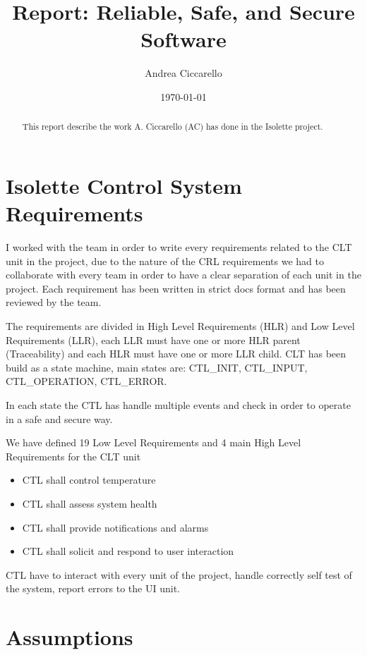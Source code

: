 \documentclass[a4paper, 12pt]{article}
\title{Report: Reliable, Safe, and Secure Software}
\author{Andrea Ciccarello}
\date{\today}
\begin{document}
\maketitle

\begin{abstract}
This report describe the work A. Ciccarello (AC) has done in the Isolette project.
\end{abstract}

\tableofcontents

\section{Isolette Control System Requirements}

I worked with the team in order to write every requirements related to the CLT unit in the project,
due to the nature of the CRL requirements we had to collaborate with every team in order to have a clear
separation of each unit in the project.
Each requirement has been written in strict docs format and has been reviewed by the team.

The requirements are divided in High Level Requirements (HLR) and Low Level Requirements (LLR),
each LLR must have one or more HLR parent (Traceability) and each HLR must have one or more LLR child.
CLT has been build as a state machine, main states are: CTL\_INIT, CTL\_INPUT, CTL\_OPERATION, CTL\_ERROR.

In each state the CTL has handle multiple events and check in order to operate in a safe and secure way.

We have defined 19 Low Level Requirements and 4 main High Level Requirements for the CLT unit

\begin{itemize}
    \item CTL shall control temperature
    \item CTL shall assess system health
    \item CTL shall provide notifications and alarms
    \item CTL shall solicit and respond to user interaction
\end{itemize}

CTL have to interact with every unit of the project, handle correctly self test of the system, report errors to the UI unit.

\section{Assumptions}
\end{document}
